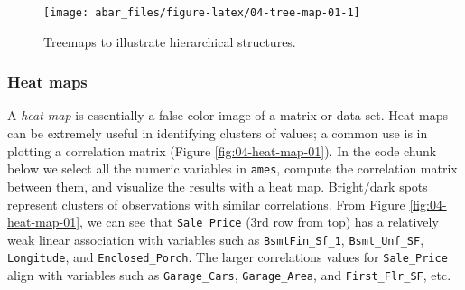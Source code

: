 \documentclass[]{book}
\newenvironment{Shaded}{\begin{snugshade}}{\end{snugshade}}
\newcommand{\DataTypeTok}[1]{\textcolor[rgb]{0.13,0.29,0.53}{#1}}
\newcommand{\KeywordTok}[1]{\textcolor[rgb]{0.13,0.29,0.53}{\textbf{#1}}}
\newcommand{\NormalTok}[1]{#1}
\newcommand{\OperatorTok}[1]{\textcolor[rgb]{0.81,0.36,0.00}{\textbf{#1}}}
\newcommand{\StringTok}[1]{\textcolor[rgb]{0.31,0.60,0.02}{#1}}
\theoremstyle{definition}
\theoremstyle{definition}
\theoremstyle{definition}
\theoremstyle{remark}
\begin{document}
\begin{Shaded}
\end{Shaded}

\begin{figure}

{\centering \texttt{[image: abar\_files/figure-latex/04-tree-map-01-1]} 

}

\caption{Treemaps to illustrate hierarchical structures.}\label{fig:04-tree-map-01}
\end{figure}

\hypertarget{heat-maps}{%
\subsubsection{Heat maps}\label{heat-maps}}

A \emph{heat map} is essentially a false color image of a matrix or data
set. Heat maps can be extremely useful in identifying clusters of
values; a common use is in plotting a correlation matrix (Figure
\ref{fig:04-heat-map-01}). In the code chunk below we select all the
numeric variables in \texttt{ames}, compute the correlation matrix
between them, and visualize the results with a heat map. Bright/dark
spots represent clusters of observations with similar correlations. From
Figure \ref{fig:04-heat-map-01}, we can see that \texttt{Sale\_Price}
(3rd row from top) has a relatively weak linear association with
variables such as \texttt{BsmtFin\_Sf\_1}, \texttt{Bsmt\_Unf\_SF},
\texttt{Longitude}, and \texttt{Enclosed\_Porch}. The larger
correlations values for \texttt{Sale\_Price} align with variables such
as \texttt{Garage\_Cars}, \texttt{Garage\_Area}, and
\texttt{First\_Flr\_SF}, etc.
\end{document}
